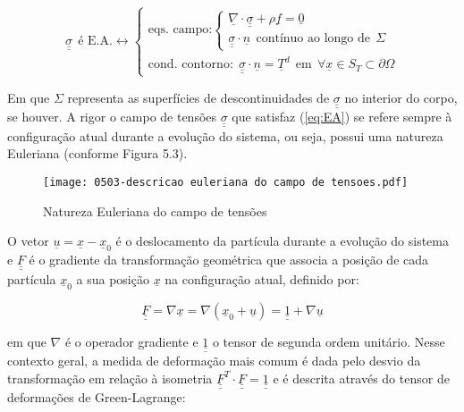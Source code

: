 \begin{equation}
	\label{eq:EA}
	\underline{\underline\sigma}~~ \text{é E.A.} \leftrightarrow \left\{
		\begin{matrix}
			\text{eqs. campo:} \left\{
				\begin{matrix}
					\underline \nabla \cdot \underline{\underline\sigma}+ \rho \underline f = \underline 0 \\ 
					\underline{\underline\sigma} \cdot \underline n ~~ \text{contínuo ao longo de} ~~ \Sigma
		
				\end{matrix}\right. \\ 
			\text{cond. contorno:}~~ \underline{\underline\sigma} \cdot \underline n = \underline T^d ~~ \text{em} ~~ \forall \underline x \in S_T \subset \partial \Omega
		\end{matrix}\right.
\end{equation}

Em que $\Sigma$  representa as superfícies de descontinuidades de $\underline{\underline \sigma}$ no interior do corpo, se houver. A rigor o campo de tensões $\underline{\underline \sigma}$ que satisfaz (\ref{eq:EA}) se refere sempre à configuração atual durante a evolução do sistema, ou seja, possui uma natureza Euleriana (conforme Figura 5.3).

\begin{figure}[H]
	\begin{center}
		\texttt{[image: 0503-descricao euleriana do campo de tensoes.pdf]}
	\end{center}
	\caption{\label{tensoes_Euleriana}Natureza Euleriana do campo de tensões}
\end{figure}

O vetor $\underline u = \underline x - \underline x_0$ é o deslocamento da partícula durante a evolução do sistema e $\underline{\underline F}$ é o gradiente da transformação geométrica que associa a posição de cada partícula $\underline x_0$ a sua posição $\underline x$ na configuração atual, definido por:

\begin{equation}
	\label{eq:transformacao_geometrica}
 	\underline{\underline F} = \nabla \underline x = \nabla \left( \underline x_0+\underline u \right) = \underline{\underline 1} + \nabla \underline u
\end{equation}

em que $\nabla$ é o operador gradiente e $\underline{\underline 1}$ o tensor de segunda ordem unitário. Nesse contexto geral, a medida de deformação mais comum é dada pelo desvio da transformação em relação à isometria $\underline{\underline F}^T \cdot \underline{\underline F} = \underline{\underline 1}$ e é descrita através do tensor de deformações de Green-Lagrange:

